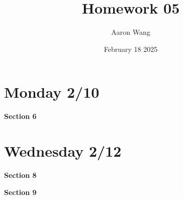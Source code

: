 \documentclass{article}
\title{Homework 05}
\author{Aaron Wang}
\date{February 18 2025}
\begin{document}
\maketitle
\section{Monday 2/10}
\begin{large}
 \textbf{Section 6}   
\end{large}
\begin{enumerate}
    \newpage
    \newpage
    \newpage
    \newpage
    \newpage
    \newpage
    \newpage
\end{enumerate}
\newpage
\section{Wednesday 2/12}
\begin{large}
 \textbf{Section 8}   
\end{large}
\begin{enumerate}
    
    
    
    
\end{enumerate}
\newpage
\begin{large}
 \textbf{Section 9}   
\end{large}
\begin{enumerate}
    
    \newpage
    
    
    
\end{enumerate}
\end{document}
